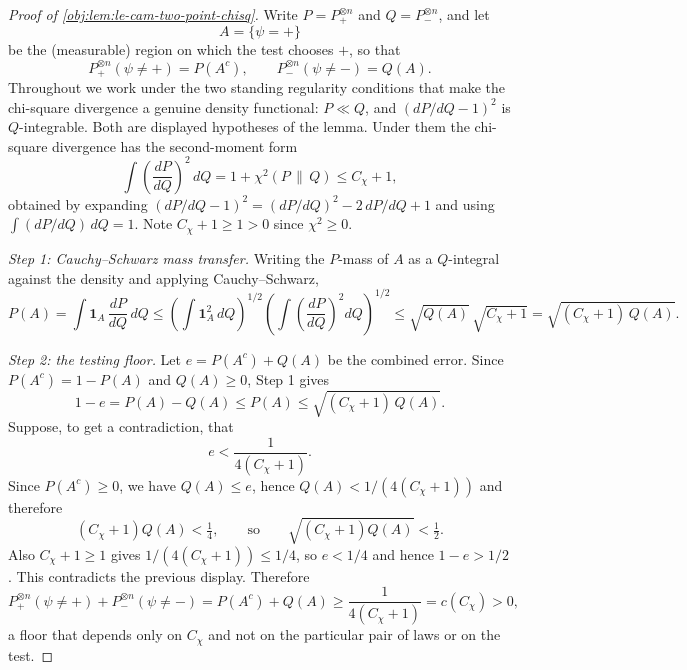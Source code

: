 \begin{proof}[Proof of \cref{obj:lem:le-cam-two-point-chisq}]
Write \(P=P_+^{\otimes n}\) and \(Q=P_-^{\otimes n}\), and let
\[
A=\{\psi=+\}
\]
be the (measurable) region on which the test chooses \(+\), so that
\[
P_+^{\otimes n}(\psi\ne +)=P(A^c),
\qquad
P_-^{\otimes n}(\psi\ne -)=Q(A).
\]
Throughout we work under the two standing regularity conditions that make the chi-square divergence a genuine density functional: \(P\ll Q\), and \((dP/dQ-1)^2\) is \(Q\)-integrable.  Both are displayed hypotheses of the lemma.  Under them the chi-square divergence has the second-moment form
\[
\int \left(\frac{dP}{dQ}\right)^2\,dQ
=1+\chi^2(P\,\|\,Q)\le C_\chi+1,
\]
obtained by expanding \((dP/dQ-1)^2=(dP/dQ)^2-2\,dP/dQ+1\) and using \(\int (dP/dQ)\,dQ=1\).  Note \(C_\chi+1\ge1>0\) since \(\chi^2\ge0\). %

\emph{Step 1: Cauchy--Schwarz mass transfer.}  Writing the \(P\)-mass of \(A\) as a \(Q\)-integral against the density and applying Cauchy--Schwarz,
\[
P(A)
=\int \mathbf 1_A\,\frac{dP}{dQ}\,dQ
\le
\left(\int \mathbf 1_A^2\,dQ\right)^{1/2}
\left(\int \left(\frac{dP}{dQ}\right)^2dQ\right)^{1/2}
\le
\sqrt{Q(A)}\,\sqrt{C_\chi+1}
=
\sqrt{(C_\chi+1)\,Q(A)} .
\]

\emph{Step 2: the testing floor.}  Let \(e=P(A^c)+Q(A)\) be the combined error.  Since \(P(A^c)=1-P(A)\) and \(Q(A)\ge0\), Step 1 gives
\[
1-e=P(A)-Q(A)\le P(A)\le \sqrt{(C_\chi+1)\,Q(A)} .
\]
Suppose, to get a contradiction, that
\[
e<\frac{1}{4(C_\chi+1)} .
\]
Since \(P(A^c)\ge0\), we have \(Q(A)\le e\), hence \(Q(A)<1/(4(C_\chi+1))\) and therefore
\[
(C_\chi+1)Q(A)<\tfrac14,
\qquad\text{so}\qquad
\sqrt{(C_\chi+1)Q(A)}<\tfrac12 .
\]
Also \(C_\chi+1\ge1\) gives \(1/(4(C_\chi+1))\le1/4\), so \(e<1/4\) and hence \(1-e>1/2\).  This contradicts the previous display.  Therefore
\[
P_+^{\otimes n}(\psi\ne +)+P_-^{\otimes n}(\psi\ne -)
 =P(A^c)+Q(A)
 \ge \frac{1}{4(C_\chi+1)}
 =c(C_\chi)>0,
\]
a floor that depends only on \(C_\chi\) and not on the particular pair of laws or on the test. %


\end{proof}
